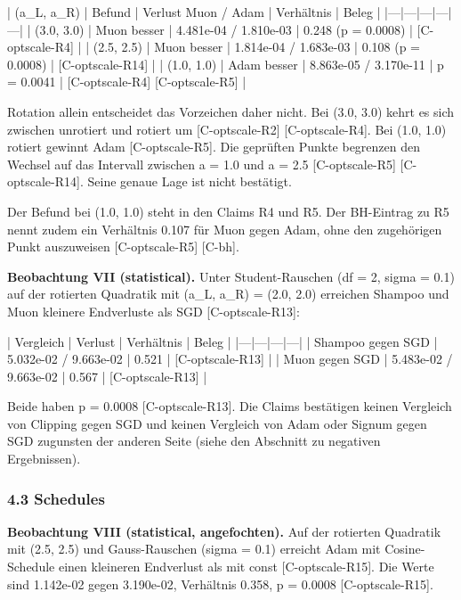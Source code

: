 \documentclass[10pt,twocolumn]{article}
\begin{document}
| (a_L, a_R) | Befund | Verlust Muon / Adam | Verhältnis | Beleg |
|---|---|---|---|---|
| (3.0, 3.0) | Muon besser | 4.481e-04 / 1.810e-03 | 0.248 (p = 0.0008) | {\scriptsize[C-optscale-R4]} |
| (2.5, 2.5) | Muon besser | 1.814e-04 / 1.683e-03 | 0.108 (p = 0.0008) | {\scriptsize[C-optscale-R14]} |
| (1.0, 1.0) | Adam besser | 8.863e-05 / 3.170e-11 | p = 0.0041 | {\scriptsize[C-optscale-R4]} {\scriptsize[C-optscale-R5]} |

Rotation allein entscheidet das Vorzeichen daher nicht. Bei (3.0, 3.0) kehrt es sich zwischen unrotiert und rotiert um {\scriptsize[C-optscale-R2]} {\scriptsize[C-optscale-R4]}. Bei (1.0, 1.0) rotiert gewinnt Adam {\scriptsize[C-optscale-R5]}. Die geprüften Punkte begrenzen den Wechsel auf das Intervall zwischen a = 1.0 und a = 2.5 {\scriptsize[C-optscale-R5]} {\scriptsize[C-optscale-R14]}. Seine genaue Lage ist nicht bestätigt.

Der Befund bei (1.0, 1.0) steht in den Claims R4 und R5. Der BH-Eintrag zu R5 nennt zudem ein Verhältnis 0.107 für Muon gegen Adam, ohne den zugehörigen Punkt auszuweisen {\scriptsize[C-optscale-R5]} {\scriptsize[C-bh]}.

\textbf{Beobachtung VII (statistical).} Unter Student-Rauschen (df = 2, sigma = 0.1) auf der rotierten Quadratik mit (a_L, a_R) = (2.0, 2.0) erreichen Shampoo und Muon kleinere Endverluste als SGD {\scriptsize[C-optscale-R13]}:

| Vergleich | Verlust | Verhältnis | Beleg |
|---|---|---|---|
| Shampoo gegen SGD | 5.032e-02 / 9.663e-02 | 0.521 | {\scriptsize[C-optscale-R13]} |
| Muon gegen SGD | 5.483e-02 / 9.663e-02 | 0.567 | {\scriptsize[C-optscale-R13]} |

Beide haben p = 0.0008 {\scriptsize[C-optscale-R13]}. Die Claims bestätigen keinen Vergleich von Clipping gegen SGD und keinen Vergleich von Adam oder Signum gegen SGD zugunsten der anderen Seite (siehe den Abschnitt zu negativen Ergebnissen).

\subsubsection*{4.3 Schedules}

\textbf{Beobachtung VIII (statistical, angefochten).} Auf der rotierten Quadratik mit (2.5, 2.5) und Gauss-Rauschen (sigma = 0.1) erreicht Adam mit Cosine-Schedule einen kleineren Endverlust als mit const {\scriptsize[C-optscale-R15]}. Die Werte sind 1.142e-02 gegen 3.190e-02, Verhältnis 0.358, p = 0.0008 {\scriptsize[C-optscale-R15]}.
\end{document}
